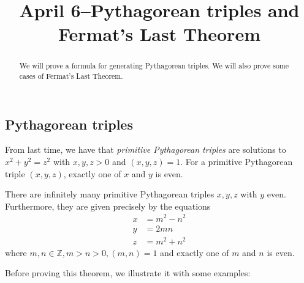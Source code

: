 \documentclass{ximera}
\title{April 6--Pythagorean triples and Fermat's Last Theorem}
\begin{document}
  
\begin{abstract}  
We will prove a formula for generating Pythagorean triples. We will also prove some cases of Fermat's Last Theorem.\end{abstract}  
\maketitle  
\subsection{Pythagorean triples}

From last time, we have that \emph{primitive Pythagorean triples} are solutions to $x^2+y^2=z^2$ with $x,y,z>0$ and $(x,y,z)=1$. For a primitive Pythagorean triple $(x,y,z)$, exactly one of $x$ and $y$ is even.

\begin{theorem}
 There are infinitely many primitive Pythagorean triples $x,y,z$ with $y$ even. Furthermore, they are given precisely by the equations 
\begin{align*}
 x&=m^2-n^2\\
 y&=2mn\\
 z&=m^2+n^2
\end{align*}
where $m,n\in\mathbb{Z}, m>n>0, (m,n)=1$ and exactly one of $m$ and $n$ is even.
\end{theorem}

Before proving this theorem, we illustrate it with some examples:
\end{document}
